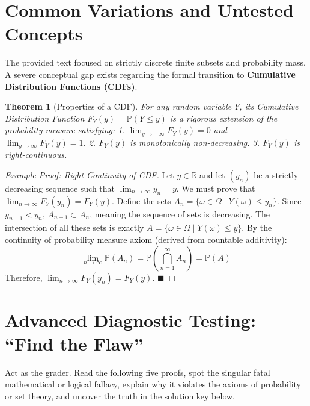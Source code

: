 \documentclass[11pt]{article}
\theoremstyle{definition}
\theoremstyle{plain}
\newtheorem{theorem}{Theorem}[section]
\theoremstyle{remark}
\newcommand{\R}{\mathbb{R}}
\renewcommand{\P}{\mathbb{P}}
\newcommand{\1}{\mathbf{1}}
\begin{document}
\section{Common Variations and Untested Concepts}

The provided text focused on strictly discrete finite subsets and probability mass. A severe conceptual gap exists regarding the formal transition to \textbf{Cumulative Distribution Functions (CDFs)}.

\begin{theorem}[Properties of a CDF]
For any random variable $Y$, its Cumulative Distribution Function $F_Y(y) = \P(Y \le y)$ is a rigorous extension of the probability measure satisfying:
1. $\lim_{y \to -\infty} F_Y(y) = 0$ and $\lim_{y \to \infty} F_Y(y) = 1$.
2. $F_Y(y)$ is monotonically non-decreasing.
3. $F_Y(y)$ is right-continuous.
\end{theorem}

\begin{proof}[Example Proof: Right-Continuity of CDF]
Let $y \in \R$ and let $(y_n)$ be a strictly decreasing sequence such that $\lim_{n \to \infty} y_n = y$.
We must prove that $\lim_{n \to \infty} F_Y(y_n) = F_Y(y)$.
Define the sets $A_n = \{\omega \in \Omega \mid Y(\omega) \le y_n\}$. 
Since $y_{n+1} < y_n$, $A_{n+1} \subset A_n$, meaning the sequence of sets is decreasing.
The intersection of all these sets is exactly $A = \{\omega \in \Omega \mid Y(\omega) \le y\}$.
By the continuity of probability measure axiom (derived from countable additivity):
\[ \lim_{n \to \infty} \P(A_n) = \P\left( \bigcap_{n=1}^\infty A_n \right) = \P(A) \]
Therefore, $\lim_{n \to \infty} F_Y(y_n) = F_Y(y)$. $\blacksquare$
\end{proof}

\section{Advanced Diagnostic Testing: ``Find the Flaw''}

Act as the grader. Read the following five proofs, spot the singular fatal mathematical or logical fallacy, explain why it violates the axioms of probability or set theory, and uncover the truth in the solution key below.
\end{document}

